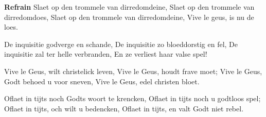 \footnotemark [
ititle={Slaet op den trommele},
tu={Bedructe hertekens}]


\beginchorus
\textbf{Refrain}
Slaet op den trommele van dirredomdeine,
Slaet op den trommele van dirredomdoes,
Slaet op den trommele van dirredomdeine,
Vive le geus, is nu de loes.
\endchorus

\beginverse
De inquisitie godverge en schande,
De inquisitie zo bloeddorstig en fel,
De inquisitie zal ter helle verbranden,
En ze verliest haar valse spel!
\endverse

\beginverse
Vive le Geus, wilt christelick leven,
Vive le Geus, houdt frave moet;
Vive le Geus, Godt behoed u voor sneven,
Vive le Geus, edel christen bloet.
\endverse

\beginverse
Oflaet in tijts noch Godts woort te krencken,
Oflaet in tijts noch u godtloos spel;
Oflaet in tijts, och wilt u bedencken,
Oflaet in tijts, en valt Godt niet rebel.
\endverse
\endsong